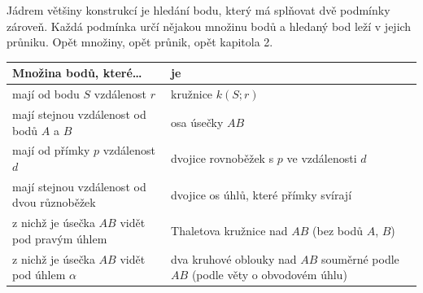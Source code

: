 Jádrem většiny konstrukcí je hledání bodu, který má splňovat dvě podmínky zároveň. Každá podmínka určí nějakou množinu bodů a hledaný bod leží v jejich průniku. Opět množiny, opět průnik, opět kapitola 2.

\begin{definitionbox}
  \begin{center}
    \renewcommand{\arraystretch}{1.4}
    \begin{tabular}{|p{6.5cm}|p{6.5cm}|}
      \hline
      Množina bodů, které\ldots & je \\
      \hline
      mají od bodu $S$ vzdálenost $r$ & kružnice $k(S; r)$ \\
      mají stejnou vzdálenost od bodů $A$ a $B$ & osa úsečky $AB$ \\
      mají od přímky $p$ vzdálenost $d$ & dvojice rovnoběžek s $p$ ve vzdálenosti $d$ \\
      mají stejnou vzdálenost od dvou různoběžek & dvojice os úhlů, které přímky svírají \\
      z nichž je úsečka $AB$ vidět pod pravým úhlem & Thaletova kružnice nad $AB$ (bez bodů $A$, $B$) \\
      z nichž je úsečka $AB$ vidět pod úhlem $\alpha$ & dva kruhové oblouky nad $AB$ souměrné podle $AB$ (podle věty o obvodovém úhlu) \\
      \hline
    \end{tabular}
  \end{center}
\end{definitionbox}

